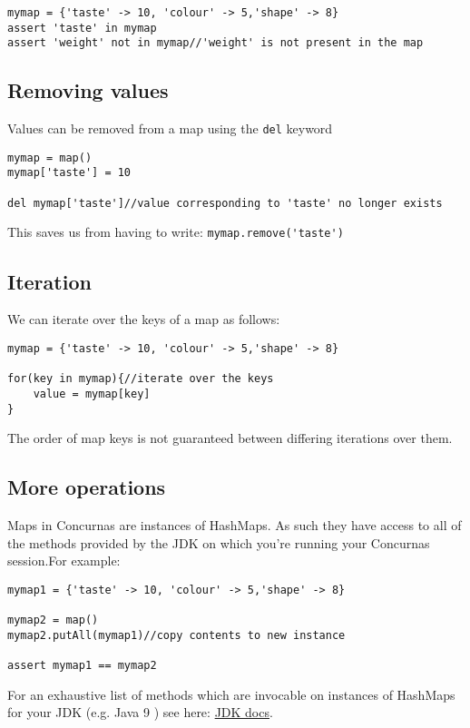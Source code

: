 \documentclass[conc-doc]{subfiles}
\begin{document}
\begin{lstlisting}
mymap = {'taste' -> 10, 'colour' -> 5,'shape' -> 8}
assert 'taste' in mymap
assert 'weight' not in mymap//'weight' is not present in the map
\end{lstlisting}

\subsection{Removing values}
Values can be removed from a map using the \lstinline{del} keyword
\begin{lstlisting}
mymap = map()
mymap['taste'] = 10

del mymap['taste']//value corresponding to 'taste' no longer exists
\end{lstlisting}

This saves us from having to write: \lstinline{mymap.remove('taste')}

\subsection{Iteration}
We can iterate over the keys of a map as follows:
\begin{lstlisting}
mymap = {'taste' -> 10, 'colour' -> 5,'shape' -> 8}

for(key in mymap){//iterate over the keys
	value = mymap[key]
}
\end{lstlisting}

The order of map keys is not guaranteed between differing iterations over them.

\subsection{More operations}
Maps in Concurnas are instances of HashMaps. As such they have access to all of the methods provided by the JDK on which you're running your Concurnas session.For example:

\begin{lstlisting}
mymap1 = {'taste' -> 10, 'colour' -> 5,'shape' -> 8}

mymap2 = map()
mymap2.putAll(mymap1)//copy contents to new instance

assert mymap1 == mymap2
\end{lstlisting}

For an exhaustive list of methods which are invocable on instances of HashMaps for your JDK (e.g. Java 9 ) see here: \href{https://docs.oracle.com/javase/9/docs/api/index.html?overview-summary.html}{JDK docs}.
\end{document}

